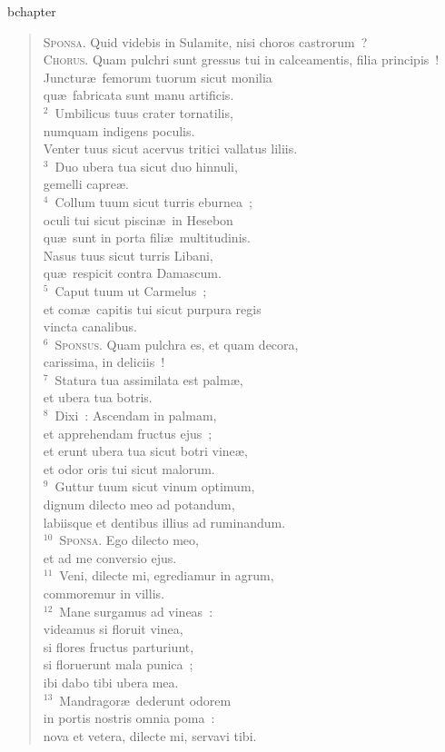 bchapter\begin{verse}\vspace{-19pt}\textsc{Sponsa.} Quid videbis in Sulamite, nisi choros castrorum~?\\ \textsc{Chorus.} Quam pulchri sunt gressus tui in calceamentis, filia principis~!\\ Junctur\ae\ femorum tuorum sicut monilia\\ qu\ae\ fabricata sunt manu artificis.\\
${}^{2}$~Umbilicus tuus crater tornatilis,\\ numquam indigens poculis.\\ Venter tuus sicut acervus tritici vallatus liliis.\\
${}^{3}$~Duo ubera tua sicut duo hinnuli,\\ gemelli capre\ae .\\
${}^{4}$~Collum tuum sicut turris eburnea~;\\ oculi tui sicut piscin\ae\ in Hesebon\\ qu\ae\ sunt in porta fili\ae\ multitudinis.\\ Nasus tuus sicut turris Libani,\\ qu\ae\ respicit contra Damascum.\\
${}^{5}$~Caput tuum ut Carmelus~;\\ et com\ae\ capitis tui sicut purpura regis\\ vincta canalibus.\\
${}^{6}$~\textsc{Sponsus.} Quam pulchra es, et quam decora,\\ carissima, in deliciis~!\\
${}^{7}$~Statura tua assimilata est palm\ae ,\\ et ubera tua botris.\\
${}^{8}$~Dixi~: Ascendam in palmam,\\ et apprehendam fructus ejus~;\\ et erunt ubera tua sicut botri vine\ae ,\\ et odor oris tui sicut malorum.\\
${}^{9}$~Guttur tuum sicut vinum optimum,\\ dignum dilecto meo ad potandum,\\ labiisque et dentibus illius ad ruminandum.\\
${}^{10}$~\textsc{Sponsa.} Ego dilecto meo,\\ et ad me conversio ejus.\\
${}^{11}$~Veni, dilecte mi, egrediamur in agrum,\\ commoremur in villis.\\
${}^{12}$~Mane surgamus ad vineas~:\\ videamus si floruit vinea,\\ si flores fructus parturiunt,\\ si floruerunt mala punica~;\\ ibi dabo tibi ubera mea.\\
${}^{13}$~Mandragor\ae\ dederunt odorem\\ in portis nostris omnia poma~:\\ nova et vetera, dilecte mi, servavi tibi.\end{verse}


